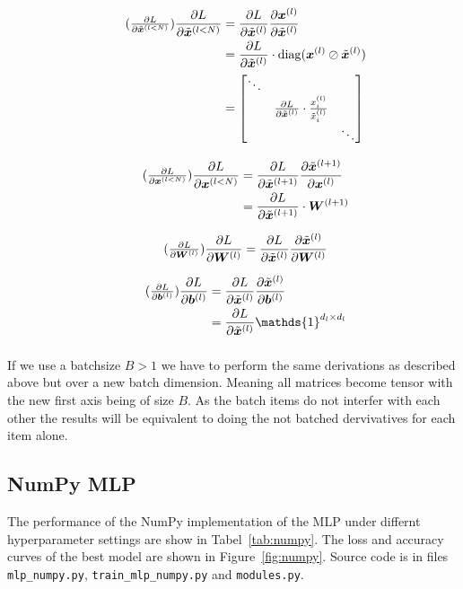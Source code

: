\documentclass{article}
\newcommand\bM[1]{\ensuremath{\begin{bmatrix}#1\end{bmatrix}}}
\newcommand\·{\ensuremath{\cdot}}
\newcommand\…{\ensuremath{\dots}}
\renewcommand\t{\ensuremath{\times}}
\DeclareMathOperator{\diag}{diag}
\newcommand{\⇔}{\ensuremath{\Leftrightarrow}}
\newcommand{\⇐}{\ensuremath{\Rightarrow}}
\newcommand{\⇒}{\ensuremath{\Leftarrow}}
\newcommand\f[2]{\ensuremath{\frac{#1}{#2}}}
\newcommand\pf[2]{\ensuremath{\frac{\partial {#1}}{\partial {#2}}}}
\newcommand*{\B}[1]{\ifmmode\bm{#1}\else\textbf{#1}\fi}
\newcommand\1{\ensuremath{\mathds{1}}}
\newcommand\ℝ{\ensuremath{\mathds{R}}}
\begin{document}
\begin{align*}
  \tag{$\pf{L}{\tilde{\B{x}}^{(l<N)}}$}
  \pf{L}{\tilde{\B{x}}^{(l<N)}}
  &= \pf{L}{\tilde{\B{x}}^{(l)}}\pf{\B{x}^{(l)}}{\tilde{\B{x}}^{(l)}}\\
  &= \pf{L}{\tilde{\B{x}}^{(l)}}\·\diag(\B{x}^{(l)}\oslash\tilde{\B{x}}^{(l)})\\
  &= \bM{\ddots & &\\ & \pf{L}{\tilde{\B{x}}^{(l)}}\·\f{x^{(l)}_i}{\tilde{x}^{(l)}_i} &\\ & &\ddots}
\end{align*}

\begin{align*}
  \tag{$\pf{L}{\B{x}^{(l<N)}}$}
  \pf{L}{\B{x}^{(l<N)}}
  &= \pf{L}{\tilde{\B{x}}^{(l+1)}}\pf{\tilde{\B{x}}^{(l+1)}}{\B{x}^{(l)}}\\
  &= \pf{L}{\tilde{\B{x}}^{(l+1)}}\·\B{W}^{(l+1)}\\
\end{align*}

\begin{align*}
  \tag{$\pf{L}{\B{W}^{(l)}}$}
  \pf{L}{\B{W}^{(l)}}
  &= \pf{L}{\tilde{\B{x}}^{(l)}}\pf{\tilde{\B{x}}^{(l)}}{\B{W}^{(l)}}\\
\end{align*}

\begin{align*}
  \tag{$\pf{L}{\B{b}^{(l)}}$}
  \pf{L}{\B{b}^{(l)}}
  &= \pf{L}{\tilde{\B{x}}^{(l)}}\pf{\tilde{\B{x}}^{(l)}}{\B{b}^{(l)}}\\
  &= \pf{L}{\tilde{\B{x}}^{(l)}}\1^{d_l\t d_l}
\end{align*}

\subsubsection{}
If we use a batchsize $B>1$ we have to perform the same derivations as described above but over a new batch dimension.
Meaning all matrices become tensor with the new first axis being of size $B$.
As the batch items do not interfer with each other the results will be equivalent to doing the not batched dervivatives for each item alone.

\subsection{NumPy MLP}
The performance of the NumPy implementation of the MLP under differnt hyperparameter settings are show in Tabel~\ref{tab:numpy}.
The loss and accuracy curves of the best model are shown in Figure~\ref{fig:numpy}.
Source code is in files \texttt{mlp\_numpy.py}, \texttt{train\_mlp\_numpy.py} and \texttt{modules.py}.
\end{document}
